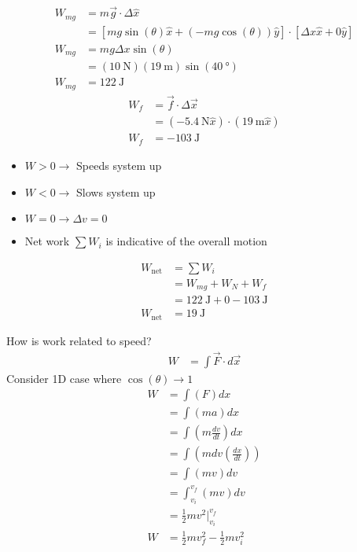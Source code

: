\documentclass{article}
\begin{document}
\begin{align*}
	W_{mg} & = m\vec{g} \cdot \Delta \hat{x} \\
		   & = \left[ mg\sin(\theta) \hat{x} + (-mg\cos(\theta)) \hat{y} \right] \cdot \left[ \Delta x \hat{x} + 0 \hat{y} \right] \\
	W_{mg} & = mg\Delta x\sin(\theta) \\
		   & = (\SI{10}{\newton})(\SI{19}{\meter})\sin(\SI{40}{\degree}) \\
	W_{mg} & = \SI{122}{\joule}
\end{align*}
\begin{align*}
	W_f & = \vec{f} \cdot \Delta \vec{x} \\
		& = (-\SI{5.4}{\newton} \hat{x}) \cdot (\SI{19}{\meter} \hat{x}) \\
	W_f & = -\SI{103}{\joule}
\end{align*}
\begin{itemize}
	\item $ W > 0 \rightarrow $ Speeds system up
	\item $ W < 0 \rightarrow $ Slows system up
	\item $ W = 0 \rightarrow \Delta v = 0 $
	\item Net work $ \sum W_i $ is indicative of the overall motion
\end{itemize}
\begin{align*}
	W_\text{net} & = \sum W_i \\
				 & = W_{mg} + W_N + W_f \\
				 & = \SI{122}{\joule} + 0 - \SI{103}{\joule} \\
	W_\text{net} & = \SI{19}{\joule}
\end{align*}

\hr

How is work related to speed?
\begin{align*}
	W & = \int \vec{F} \cdot d\vec{x}
\end{align*}
Consider 1D case where $ \cos(\theta) \rightarrow 1 $
\begin{align*}
	W & = \int \left( F \right) dx \\
	  & = \int \left( ma \right) dx \\
	  & = \int \left( m\frac{dv}{dt} \right) dx \\
	  & = \int \left( mdv \left( \frac{dx}{dt} \right) \right) \\
	  & = \int \left( mv \right) dv \\
	  & = \int_{v_i}^{v_f} \left( mv \right) dv \\
	  & = \frac{1}{2}mv^2 \biggr\rvert_{v_i}^{v_f} \\
	W & = \frac{1}{2}mv_f^2 - \frac{1}{2}mv_i^2
\end{align*}
\end{document}
